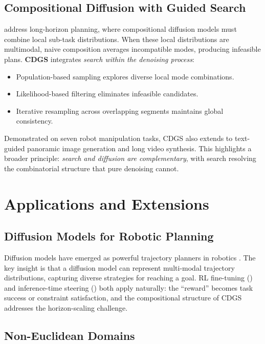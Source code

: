 \documentclass[11pt]{article}
\begin{document}
\subsection{Compositional Diffusion with Guided Search}

\citet{mishra2026cdgs} address long-horizon planning, where compositional diffusion models must combine local sub-task distributions.
When these local distributions are multimodal, naive composition averages incompatible modes, producing infeasible plans.
\textbf{CDGS} integrates \emph{search within the denoising process}:
\begin{itemize}
    \item Population-based sampling explores diverse local mode combinations.
    \item Likelihood-based filtering eliminates infeasible candidates.
    \item Iterative resampling across overlapping segments maintains global consistency.
\end{itemize}
Demonstrated on seven robot manipulation tasks, CDGS also extends to text-guided panoramic image generation and long video synthesis.
This highlights a broader principle: \emph{search and diffusion are complementary}, with search resolving the combinatorial structure that pure denoising cannot.

\section{Applications and Extensions}
\label{sec:applications}

\subsection{Diffusion Models for Robotic Planning}

Diffusion models have emerged as powerful trajectory planners in robotics \citep{janner2022planning,chi2023diffusion}.
The key insight is that a diffusion model can represent multi-modal trajectory distributions, capturing diverse strategies for reaching a goal.
RL fine-tuning () and inference-time steering () both apply naturally: the ``reward'' becomes task success or constraint satisfaction, and the compositional structure of CDGS \citep{mishra2026cdgs} addresses the horizon-scaling challenge.

\subsection{Non-Euclidean Domains}
\end{document}
